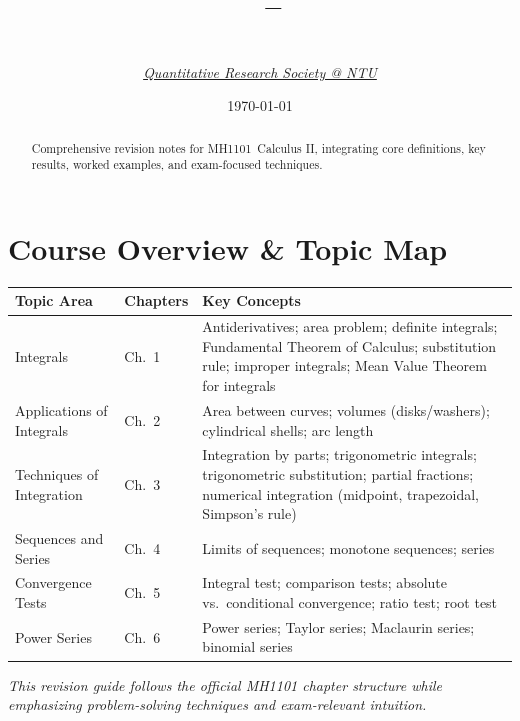 \documentclass[12pt]{article}
\title{%
    \vspace{-0.5cm}
    {\Large\bfseries \CourseCode\ \CourseName{} -- \DocType}
}
\author{\AcademicYear \\[0.3em]
\textit{\href{https://qrsntu.org}{\color{black}Quantitative Research Society @ NTU}}}
\date{\today}
\newcommand{\CourseCode}{MH1101}
\newcommand{\CourseName}{Calculus II}
\begin{document}
\maketitle
\thispagestyle{plainfirst}

\begin{abstract}
\noindent
Comprehensive revision notes for \CourseCode\ \CourseName, integrating core definitions, key results, worked examples, and exam-focused techniques.
\end{abstract}

\vspace{0.5cm}

\section*{Course Overview \& Topic Map}


\begin{center}
\begin{tabular}{|l|l|p{8.3cm}|}
\hline
\textbf{Topic Area} & \textbf{Chapters} & \textbf{Key Concepts} \\
\hline
Integrals & Ch.\ 1 & Antiderivatives; area problem; definite integrals; Fundamental Theorem of Calculus; substitution rule; improper integrals; Mean Value Theorem for integrals \\
\hline
Applications of Integrals & Ch.\ 2 & Area between curves; volumes (disks/washers); cylindrical shells; arc length \\
\hline
Techniques of Integration & Ch.\ 3 & Integration by parts; trigonometric integrals; trigonometric substitution; partial fractions; numerical integration (midpoint, trapezoidal, Simpson's rule) \\
\hline
Sequences and Series & Ch.\ 4 & Limits of sequences; monotone sequences; series \\
\hline
Convergence Tests & Ch.\ 5 & Integral test; comparison tests; absolute vs.\ conditional convergence; ratio test; root test \\
\hline
Power Series & Ch.\ 6 & Power series; Taylor series; Maclaurin series; binomial series \\
\hline
\end{tabular}
\end{center}

\noindent
\textit{This revision guide follows the official MH1101 chapter structure while emphasizing problem-solving techniques and exam-relevant intuition.}
\end{document}
